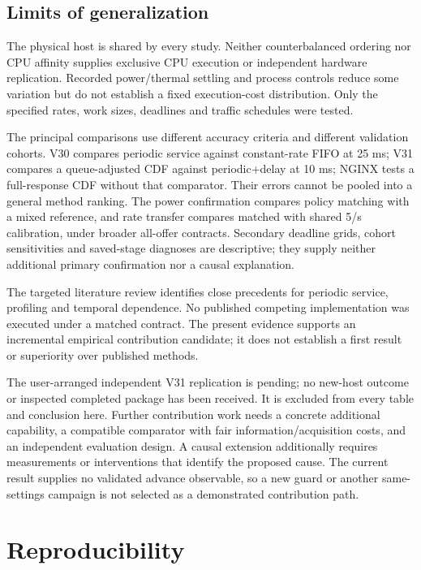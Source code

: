 \documentclass[11pt,a4paper]{article}
\begin{document}
\subsection{Limits of generalization}

The physical host is shared by every study. Neither counterbalanced ordering
nor CPU affinity supplies exclusive CPU execution or independent hardware
replication. Recorded power/thermal settling and process controls reduce some
variation but do not establish a fixed execution-cost distribution. Only the
specified rates, work sizes, deadlines and traffic schedules were tested.

The principal comparisons use different accuracy criteria and different
validation cohorts. V30 compares periodic service against constant-rate FIFO
at 25 ms; V31 compares a queue-adjusted CDF against periodic+delay at
10 ms; NGINX tests a full-response CDF without that comparator. Their errors
cannot be pooled into a general method ranking. The power confirmation compares
policy matching with a mixed reference, and rate transfer compares matched with
shared 5/s calibration, under broader all-offer contracts. Secondary deadline grids,
cohort sensitivities and saved-stage diagnoses are descriptive; they supply
neither additional primary confirmation nor a causal explanation.

The targeted literature review identifies close precedents for periodic service,
profiling and temporal dependence. No published competing implementation was
executed under a matched contract. The present evidence supports an incremental
empirical contribution candidate; it does not establish a first result or
superiority over published methods.

The user-arranged independent V31 replication is pending; no new-host outcome
or inspected completed package has been received. It is excluded from every
table and conclusion here. Further contribution work needs a concrete additional
capability, a compatible comparator with fair information/acquisition costs,
and an independent evaluation design. A causal extension additionally requires
measurements or interventions that identify the proposed cause. The current
result supplies no validated advance observable, so a new guard or another
same-settings campaign is not selected as a demonstrated contribution path.

\section{Reproducibility}
\end{document}
